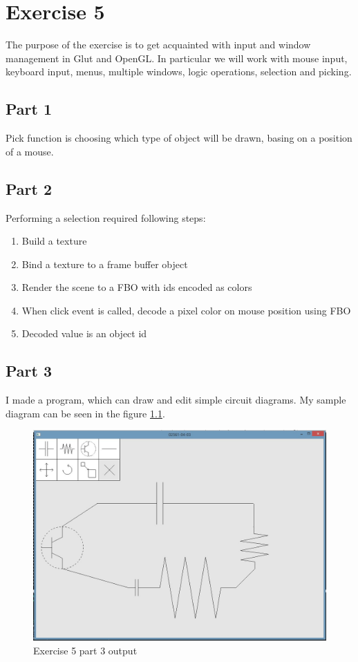 \chapter{Exercise 5}
The purpose of the exercise is to get acquainted with input and
window management in Glut and OpenGL. In particular we will
work with mouse input, keyboard input, menus, multiple windows,
logic operations, selection and picking.

\section{Part 1}
	Pick function is choosing which type of object will be drawn, basing on
	a position of a mouse.
\section{Part 2}
	Performing a selection required following steps:
	\begin{enumerate}
	\item Build a texture
	\item Bind a texture to a frame buffer object
	\item Render the scene to a FBO with ids encoded as colors
	\item When click event is called, decode a pixel color on mouse position using FBO
	\item Decoded value is an object id
	\end{enumerate}	 
\section{Part 3}
I made a program, which can draw and edit simple circuit diagrams. My sample
diagram can be seen in the figure \ref{fig:exercise_5_part_3}.
\begin{figure}[ht!]
	\begin{center}
		\includegraphics[width=1.0\textwidth]{figures/exercise_5_part_3}
	\end{center}
	\vspace{-4.5ex}\caption{Exercise 5 part 3 output}
	\label{fig:exercise_5_part_3} 
\end{figure}